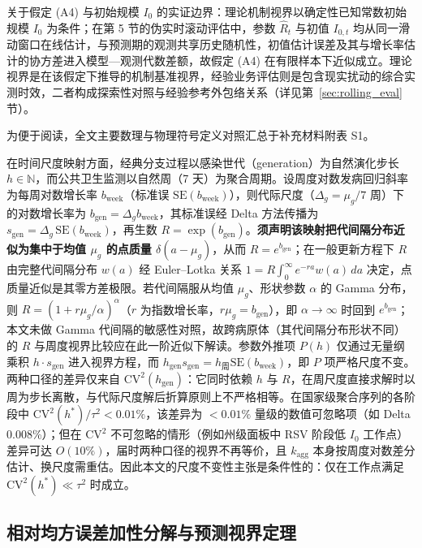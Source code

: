 \documentclass[11pt,a4paper]{article}
\theoremstyle{plain}
\theoremstyle{definition}
\begin{document}
关于假定 (A4) 与初始规模 $I_0$ 的实证边界：理论机制视界以确定性已知常数初始规模 $I_0$ 为条件；在第 5 节的伪实时滚动评估中，参数 $\hat{R}_t$ 与初值 $I_{0,t}$ 均从同一滑动窗口在线估计，与预测期的观测共享历史随机性，初值估计误差及其与增长率估计的协方差进入模型—观测代数差额，故假定 (A4) 在有限样本下近似成立。理论视界是在该假定下推导的机制基准视界，经验业务评估则是包含现实扰动的综合实测时效，二者构成探索性对照与经验参考外包络关系（详见第~\ref{sec:rolling_eval} 节）。

为便于阅读，全文主要数理与物理符号定义对照汇总于补充材料附表 S1。


在时间尺度映射方面，经典分支过程以感染世代（generation）为自然演化步长 $h \in \mathbb{N}$，而公共卫生监测以自然周（7 天）为聚合周期。设周度对数发病回归斜率为每周对数增长率 $b_{\text{week}}$（标准误 $\text{SE}(b_{\text{week}})$），则代际尺度（$\Delta_g = \mu_g/7$ 周）下的对数增长率为 $b_{\text{gen}} = \Delta_g b_{\text{week}}$，其标准误经 Delta 方法传播为 $s_{\text{gen}} = \Delta_g\,\text{SE}(b_{\text{week}})$，再生数 $R = \exp(b_{\text{gen}})$。\textbf{须声明该映射把代间隔分布近似为集中于均值 $\mu_g$ 的点质量 $\delta(a-\mu_g)$}，从而 $R = e^{b_{\text{gen}}}$；在一般更新方程下 $R$ 由完整代间隔分布 $w(a)$ 经 Euler--Lotka 关系 $1 = R\int_0^\infty e^{-ra}w(a)\,da$ 决定\citep{park2023inferring, hart2022generation, chan2026estimating, chan2025influenza, cohen2024respiratory}，点质量近似是其零方差极限。若代间隔服从均值 $\mu_g$、形状参数 $\alpha$ 的 Gamma 分布，则 $R = \left(1 + r\mu_g/\alpha\right)^{\alpha}$（$r$ 为指数增长率，$r\mu_g = b_{\text{gen}}$），即 $\alpha \to \infty$ 时回到 $e^{b_{\text{gen}}}$；本文未做 Gamma 代间隔的敏感性对照，故跨病原体（其代间隔分布形状不同）的 $R$ 与周度视界比较应在此一阶近似下解读。参数外推项 $P(h)$ 仅通过无量纲乘积 $h \cdot s_{\text{gen}}$ 进入视界方程，而 $h_{\text{gen}} s_{\text{gen}} = h_{\text{周}} \text{SE}(b_{\text{week}})$，即 $P$ 项严格尺度不变。两种口径的差异仅来自 $\text{CV}^2(h_{\text{gen}})$：它同时依赖 $h$ 与 $R$，在周尺度直接求解时以周为步长离散，与代际尺度解后折算原则上不严格相等。在国家级聚合序列的各阶段中 $\text{CV}^2(h^*)/\tau^2 < 0.01\%$，该差异为 $<0.01\%$ 量级的数值可忽略项（如 Delta 0.008\%）；但在 $\text{CV}^2$ 不可忽略的情形（例如州级面板中 RSV 阶段低 $I_0$ 工作点）差异可达 $O(10\%)$，届时两种口径的视界不再等价，且 $k_{\text{agg}}$ 本身按周度对数差分估计、换尺度需重估。因此本文的尺度不变性主张是条件性的：仅在工作点满足 $\text{CV}^2(h^*) \ll \tau^2$ 时成立。

\subsection{相对均方误差加性分解与预测视界定理}
\end{document}
